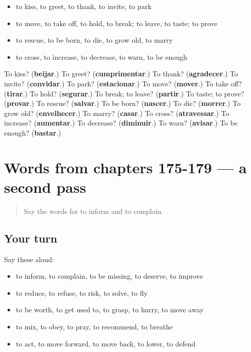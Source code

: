 \begin{itemize}
\raggedright
  \item to kiss, to greet, to thank, to invite, to park
  \item to move, to take off, to hold, to break; to leave, to taste; to prove
  \item to rescue, to be born, to die, to grow old, to marry
  \item to cross, to increase, to decrease, to warn, to be enough
\end{itemize}

\begin{tcolorbox}[breakable,colback=teal!4,colframe=teal!35!black,title={Before you move on}]
To kiss? (\textbf{beijar}.) To greet? (\textbf{cumprimentar}.) To thank? (\textbf{agradecer}.) To invite? (\textbf{convidar}.) To park? (\textbf{estacionar}.) To move? (\textbf{mover}.) To take off? (\textbf{tirar}.) To hold? (\textbf{segurar}.) To break; to leave? (\textbf{partir}.) To taste; to prove? (\textbf{provar}.) To rescue? (\textbf{salvar}.) To be born? (\textbf{nascer}.) To die? (\textbf{morrer}.) To grow old? (\textbf{envelhecer}.) To marry? (\textbf{casar}.) To cross? (\textbf{atravessar}.) To increase? (\textbf{aumentar}.) To decrease? (\textbf{diminuir}.) To warn? (\textbf{avisar}.) To be enough? (\textbf{bastar}.)
\end{tcolorbox}
\section[(dialogue)]{Words from chapters 175-179 — a second pass}

\label{lesson:PT-R179-second-pass-words-from-chapters-175-179}



\begin{quote}
Say the words for to inform and to complain.
\end{quote}

\subsection*{Your turn}
Say these aloud:

\begin{itemize}
\raggedright
  \item to inform, to complain, to be missing, to deserve, to improve
  \item to reduce, to refuse, to risk, to solve, to fly
  \item to be worth, to get used to, to grasp, to hurry, to move away
  \item to mix, to obey, to pray, to recommend, to breathe
  \item to act, to move forward, to move back, to lower, to defend
\end{itemize}


